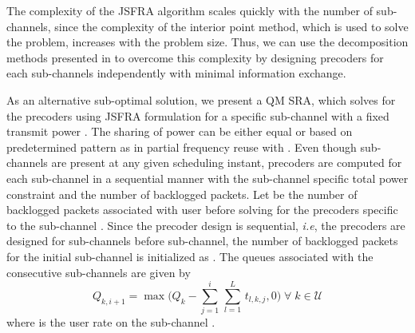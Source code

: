 The complexity of the \ac{JSFRA} algorithm scales quickly with the number of sub-channels, since the complexity of the interior point method, which is used to solve the problem, increases with the problem size. Thus, we can use the decomposition methods presented in \cite{palomar2006tutorial,boyd2011distributed} to overcome this complexity by designing precoders for each sub-channels independently with minimal information exchange.

As an alternative sub-optimal solution, we present a \acl{QM} \ac{SRA}, which solves for the precoders using \ac{JSFRA} formulation for a specific sub-channel  with a fixed transmit power . The sharing of power can be either equal or based on predetermined pattern as in partial frequency reuse with . Even though  sub-channels are present at any given scheduling instant, precoders are computed for each sub-channel in a sequential manner with the sub-channel specific total power constraint  and the number of backlogged packets. Let  be the number of backlogged packets associated with user  before solving for the precoders specific to the sub-channel . Since the precoder design is sequential, \textit{i.e}, the precoders are designed for sub-channels \me{[0,i-1]} before  sub-channel, the number of backlogged packets for the initial sub-channel is initialized as . The queues associated with the consecutive sub-channels are given by
\begin{equation}	\label{eqn-weight}
	Q_{k,i+1} = \max \Big ( Q_k - \sum_{j = 1}^{i} \, \sum_{l = 1}^{L} \, t_{l,k,j} ,0 \Big ) \; \forall \; k \in \mathcal{U}
\end{equation}
where  is the  user rate on the sub-channel . 



